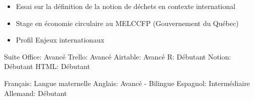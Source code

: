 \documentclass{my_cv}
\begin{document}
\vspace{1em}

\begin{adjustwidth}{2em}{0em}

\begin{itemize}
    \item Essai sur la définition de la notion de déchets en contexte international
    \item Stage en économie circulaire au MELCCFP (Gouvernement du Québec)
\end{itemize}


\begin{itemize}
    \item Profil Enjeux internationaux
\end{itemize}

\end{adjustwidth}
\vspace{1em}

\begin{multicols}{2}
    \begin{adjustwidth}{1em}{0em}
    Suite Office: Avancé
    \newline
    Trello: Avancé
    \newline
    Airtable: Avancé
    \newline
    R: Débutant
    \newline
    Notion: Débutant
    \newline
    HTML: Débutant
    \end{adjustwidth}
    \columnbreak
    \begin{adjustwidth}{1em}{0em}
    Français: Langue maternelle
    \newline
    Anglais: Avancé - Bilingue
    \newline
    Espagnol: Intermédiaire
    \newline
    Allemand: Débutant
    \end{adjustwidth}
\end{multicols}

\vspace{1em}
\end{document}
